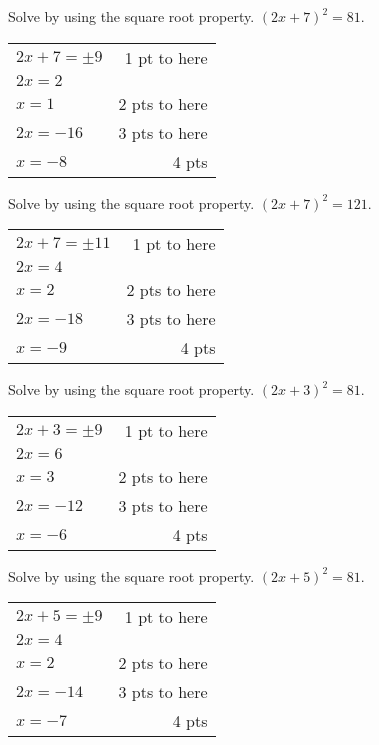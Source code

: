 {
	Solve by using the square root property. $\displaystyle (2x+7)^2=81$.
}
{
	\begin{tabular}{l r}
	$2x+7=\pm9$ & 1 pt to here\\
	$2x=2$ &  \\
	$x=1$ & 2 pts to here \\
	$2x=-16$ & 3 pts to here\\
	$x=-8$ & 4 pts \\
	\end{tabular}
}

{
	Solve by using the square root property. $\displaystyle (2x+7)^2=121$.
}
{
	\begin{tabular}{l r}
	$2x+7=\pm11$ & 1 pt to here\\
	$2x=4$ &  \\
	$x=2$ & 2 pts to here \\
	$2x=-18$ & 3 pts to here\\
	$x=-9$ & 4 pts \\
	\end{tabular}
}

{
	Solve by using the square root property. $\displaystyle (2x+3)^2=81$.
}
{
	\begin{tabular}{l r}
	$2x+3=\pm9$ & 1 pt to here\\
	$2x=6$ &  \\
	$x=3$ & 2 pts to here \\
	$2x=-12$ & 3 pts to here\\
	$x=-6$ & 4 pts \\
	\end{tabular}
}

{
	Solve by using the square root property. $\displaystyle (2x+5)^2=81$.
}
{
	\begin{tabular}{l r}
	$2x+5=\pm9$ & 1 pt to here\\
	$2x=4$ &  \\
	$x=2$ & 2 pts to here \\
	$2x=-14$ & 3 pts to here\\
	$x=-7$ & 4 pts \\
	\end{tabular}
}
